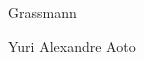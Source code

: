 \begin{center}
  {\LARGE Grassmann}\vspace{1.0cm}

  {\Large Yuri Alexandre Aoto}
\end{center}

\tableofcontents



